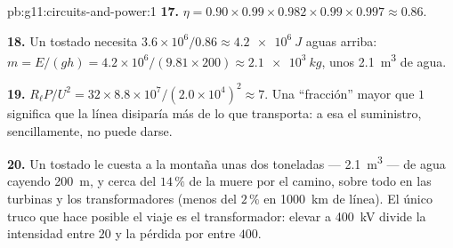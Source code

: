 \begin{solution}{pb:g11:circuits-and-power:1}
\textbf{17.} $\eta = 0.90 \times 0.99 \times 0.982 \times 0.99 \times
0.997 \approx 0.86$.

\textbf{18.} Un  tostado necesita
$3.6\times10^{6}/0.86 \approx \qty{4.2e6}{J}$ aguas arriba:
$m = E/(gh) = 4.2\times10^{6}/(9.81 \times 200) \approx \qty{2.1e3}{kg}$,
unos \qty{2.1}{m^3} de agua.

\textbf{19.} $R_\ell P/U^2 = 32 \times 8.8\times10^{7}/(2.0\times
10^{4})^2 \approx 7$. Una ``fracción'' mayor que $1$ significa que la
línea disiparía más de lo que transporta: a esa  el suministro,
sencillamente, no puede darse.

\textbf{20.} Un  tostado le cuesta a la montaña unas dos
toneladas --- \qty{2.1}{m^3} --- de agua cayendo \qty{200}{m}, y cerca
del $14\,\%$ de la  muere por el camino, sobre todo en las turbinas
y los transformadores (menos del $2\,\%$ en \qty{1000}{km} de línea). El
único truco que hace posible el viaje es el transformador: elevar a
\qty{400}{kV} divide la intensidad entre $20$ y la pérdida por  entre $400$.
\end{solution}
